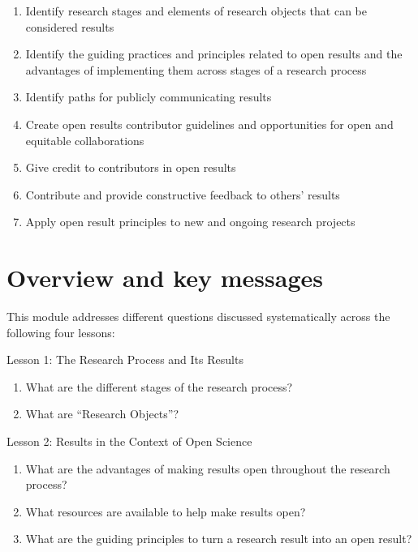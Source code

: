 \documentclass[
  letterpaper,
  DIV=11,
  numbers=noendperiod]{scrreport}
\providecommand{\tightlist}{%
  \setlength{\itemsep}{0pt}\setlength{\parskip}{0pt}}\usepackage{longtable,booktabs,array}
\begin{document}
\begin{enumerate}
\def\labelenumi{\arabic{enumi}.}
\tightlist
\item
  Identify research stages and elements of research objects that can be
  considered results
\item
  Identify the guiding practices and principles related to open results
  and the advantages of implementing them across stages of a research
  process
\item
  Identify paths for publicly communicating results
\item
  Create open results contributor guidelines and opportunities for open
  and equitable collaborations
\item
  Give credit to contributors in open results
\item
  Contribute and provide constructive feedback to others' results
\item
  Apply open result principles to new and ongoing research projects
\end{enumerate}

\hypertarget{overview-and-key-messages}{%
\section*{Overview and key messages}\label{overview-and-key-messages}}


This module addresses different questions discussed systematically
across the following four lessons:

Lesson 1: The Research Process and Its Results

\begin{enumerate}
\def\labelenumi{\arabic{enumi}.}
\tightlist
\item
  What are the different stages of the research process?
\item
  What are ``Research Objects''?
\end{enumerate}

Lesson 2: Results in the Context of Open Science

\begin{enumerate}
\def\labelenumi{\arabic{enumi}.}
\tightlist
\item
  What are the advantages of making results open throughout the research
  process?
\item
  What resources are available to help make results open?
\item
  What are the guiding principles to turn a research result into an open
  result?
\end{enumerate}
\end{document}

